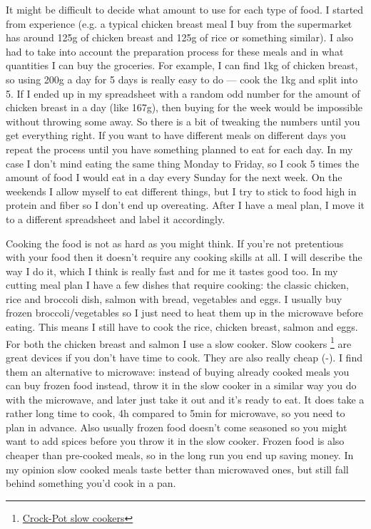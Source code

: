 \documentclass[openany, 12pt]{book}
\begin{document}
        It might be difficult to decide what amount to use for each type of food. I started from experience (e.g. a typical chicken breast meal I buy
        from the supermarket has around 125g of chicken breast and 125g of rice or something similar). I also had to take into account the preparation process for these
        meals and in what quantities I can buy the groceries. For example, I can find 1kg of chicken breast, so using 200g a day for 5 days is really easy to do --- cook the 1kg
        and split into 5. If I ended up in my spreadsheet with a random odd number for the amount of chicken breast in a day (like 167g), then buying for the week would be
        impossible without throwing some away. So there is a bit of tweaking the numbers until you get everything right. If you want to have different meals on different days 
        you repeat the process until
        you have something planned to eat for each day. In my case I don't mind eating the same thing Monday to Friday, so I cook 5 times the amount of food I would eat in a 
        day every
        Sunday for the next week. On the weekends I allow myself to eat different things, but I try to stick to food high in protein and fiber so I don't end up overeating.
        After I have a meal plan, I move it to a different spreadsheet and label it accordingly.

        Cooking the food is not as hard as you might think. If you're not pretentious with your food then it doesn't require any cooking skills at all. I will describe the way
        I do it, which I think is really fast and for me it tastes good too. In my cutting meal plan I have a few dishes that require cooking: the classic chicken,
        rice and broccoli dish, salmon with bread, vegetables and eggs. I usually buy frozen broccoli/vegetables so I just need to heat them up in the microwave before eating.
        This means I still have to cook the rice, chicken breast, salmon and eggs. For both the chicken breast and salmon I use a slow cooker. Slow cookers
        \footnote{\href{https://crockpot.co.uk/}{Crock-Pot slow cookers}} are great devices
        if you don't have time to cook. They are also really cheap (-). I find them an alternative to microwave: instead of buying already 
        cooked meals you can buy frozen
        food instead, throw it in the slow cooker in a similar way you do with the microwave, and later just take it out and it's ready to eat. It does take a rather long time 
        to cook, 4h
        compared to 5min for microwave, so you need to plan in advance. Also usually frozen food doesn't come seasoned so you might want to add spices before you throw it in 
        the slow cooker. Frozen food is also cheaper than pre-cooked meals, so in the long run you end up saving money. In my opinion slow cooked meals taste better than
        microwaved ones, but still fall behind something you'd cook in a pan.
\end{document}
